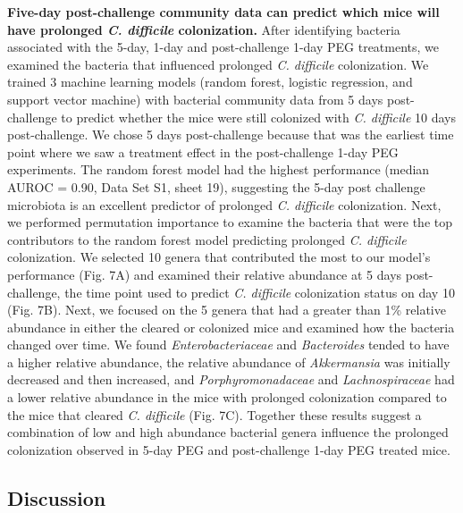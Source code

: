 \documentclass[
  11pt,
]{article}
\begin{document}
\textbf{Five-day post-challenge community data can predict which mice
will have prolonged \emph{C. difficile} colonization.} After identifying
bacteria associated with the 5-day, 1-day and post-challenge 1-day PEG
treatments, we examined the bacteria that influenced prolonged \emph{C.
difficile} colonization. We trained 3 machine learning models (random
forest, logistic regression, and support vector machine) with bacterial
community data from 5 days post-challenge to predict whether the mice
were still colonized with \emph{C. difficile} 10 days post-challenge. We
chose 5 days post-challenge because that was the earliest time point
where we saw a treatment effect in the post-challenge 1-day PEG
experiments. The random forest model had the highest performance (median
AUROC = 0.90, Data Set S1, sheet 19), suggesting the 5-day post
challenge microbiota is an excellent predictor of prolonged \emph{C.
difficile} colonization. Next, we performed permutation importance to
examine the bacteria that were the top contributors to the random forest
model predicting prolonged \emph{C. difficile }colonization. We selected
10 genera that contributed the most to our model's performance (Fig. 7A)
and examined their relative abundance at 5 days post-challenge, the time
point used to predict \emph{C. difficile} colonization status on day 10
(Fig. 7B). Next, we focused on the 5 genera that had a greater than 1\%
relative abundance in either the cleared or colonized mice and examined
how the bacteria changed over time. We found \emph{Enterobacteriaceae}
and \emph{Bacteroides} tended to have a higher relative abundance, the
relative abundance of \emph{Akkermansia} was initially decreased and
then increased, and \emph{Porphyromonadaceae} and \emph{Lachnospiraceae}
had a lower relative abundance in the mice with prolonged colonization
compared to the mice that cleared \emph{C. difficile} (Fig. 7C).
Together these results suggest a combination of low and high abundance
bacterial genera influence the prolonged colonization observed in 5-day
PEG and post-challenge 1-day PEG treated mice.

\hypertarget{discussion}{%
\subsection{Discussion}\label{discussion}}
\end{document}
